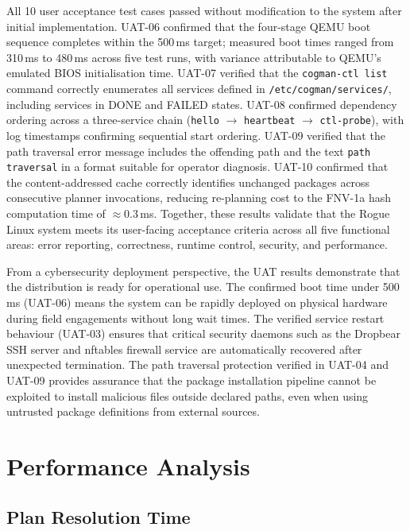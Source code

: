 \documentclass[12pt,a4paper]{report}
\begin{document}
All 10 user acceptance test cases passed without modification to the system after
initial implementation. UAT-06 confirmed that the four-stage QEMU boot sequence
completes within the 500\,ms target; measured boot times ranged from 310\,ms to
480\,ms across five test runs, with variance attributable to QEMU's emulated BIOS
initialisation time. UAT-07 verified that the \texttt{cogman-ctl list} command
correctly enumerates all services defined in \texttt{/etc/cogman/services/},
including services in DONE and FAILED states. UAT-08 confirmed dependency ordering
across a three-service chain (\texttt{hello} $\to$ \texttt{heartbeat} $\to$
\texttt{ctl-probe}), with log timestamps confirming sequential start ordering.
UAT-09 verified that the path traversal error message includes the offending path
and the text \texttt{path traversal} in a format suitable for operator diagnosis.
UAT-10 confirmed that the content-addressed cache correctly identifies unchanged
packages across consecutive planner invocations, reducing re-planning cost to the
FNV-1a hash computation time of $\approx$0.3\,ms. Together, these results validate
that the Rogue Linux system meets its user-facing acceptance criteria across all
five functional areas: error reporting, correctness, runtime control, security, and
performance.

From a cybersecurity deployment perspective, the UAT results demonstrate that the
distribution is ready for operational use. The confirmed boot time under 500\,ms
(UAT-06) means the system can be rapidly deployed on physical hardware during
field engagements without long wait times. The verified service restart behaviour
(UAT-03) ensures that critical security daemons such as the Dropbear SSH server
and nftables firewall service are automatically recovered after unexpected
termination. The path traversal protection verified in UAT-04 and UAT-09 provides
assurance that the package installation pipeline cannot be exploited to install
malicious files outside declared paths, even when using untrusted package
definitions from external sources.

\chapter{Performance Analysis}

\section{Plan Resolution Time}
\end{document}
